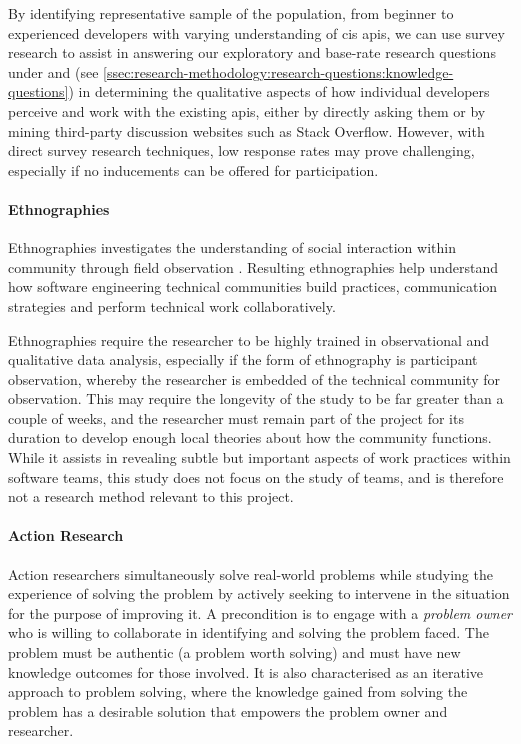 By identifying representative sample of the population, from beginner to experienced developers with varying understanding of \gls{cis} \glspl{api}, we can use survey research to assist in answering our exploratory and base-rate research questions under  and  (see \cref{ssec:research-methodology:research-questions:knowledge-questions}) in determining the qualitative aspects of how individual developers perceive and work with the existing \glspl{api}, either by directly asking them or by mining third-party discussion websites such as Stack Overflow. However, with direct survey research techniques, low response rates may prove challenging, especially if no inducements can be offered for participation.

\paragraph{Ethnographies}
Ethnographies investigates the understanding of social interaction within community through field observation \citep{Robinson:2007tp}. Resulting ethnographies help understand how software engineering technical communities build practices, communication strategies and perform technical work collaboratively. 

Ethnographies require the researcher to be highly trained in observational and qualitative data analysis, especially if the form of ethnography is participant observation, whereby the researcher is embedded of the technical community for observation. This may require the longevity of the study to be far greater than a couple of weeks, and the researcher must remain part of the project for its duration to develop enough local theories about how the community functions. While it assists in revealing subtle but important aspects of work practices within software teams, this study does not focus on the study of teams, and is therefore not a research method relevant to this project.


\paragraph{Action Research}
Action researchers simultaneously solve real-world problems while studying the experience of solving the problem \citep{Davison:2004wo} by actively seeking to intervene in the situation for the purpose of improving it. A precondition is to engage with a \textit{problem owner} who is willing to collaborate in identifying and solving the problem faced. The problem must be authentic (a problem worth solving) and must have new knowledge outcomes for those involved. It is also characterised as an iterative approach to problem solving, where the knowledge gained from solving the problem has a desirable solution that empowers the problem owner and researcher. 

